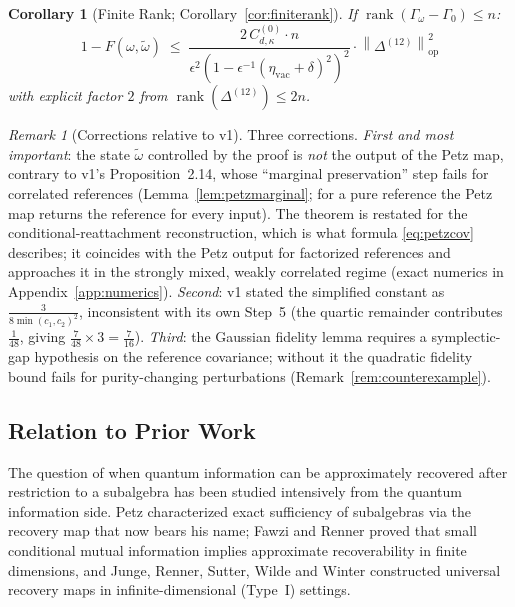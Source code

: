 \documentclass[11pt,a4paper]{article}
\theoremstyle{plain}
\newtheorem*{corollary*}{Corollary}
\theoremstyle{definition}
\theoremstyle{remark}
\newtheorem*{remark*}{Remark}
\newcommand{\opnorm}[1]{\left\lVert #1 \right\rVert_{\mathrm{op}}}
\newcommand{\rank}{\operatorname{rank}}
\newcommand{\etavac}{\eta_{\mathrm{vac}}}
\newcommand{\Cd}{C^{(0)}_{d,\kappa}}
\begin{document}
\begin{corollary*}[Finite Rank; Corollary~\ref{cor:finiterank}]
If $\rank(\Gamma_\omega - \Gamma_0) \le n$:
\begin{equation}
1 - F(\omega, \tilde{\omega}) \;\le\;
\frac{2\,\Cd \cdot n}{\epsilon^2 \left(1 - \epsilon^{-1}(\etavac + \delta)^2\right)^2}
\cdot \opnorm{\Delta^{(12)}}^2
\end{equation}
with explicit factor $2$ from $\rank(\Delta^{(12)}) \le 2n$.
\end{corollary*}

\begin{remark*}[Corrections relative to v1]
Three corrections. \emph{First and most important}: the state $\tilde{\omega}$
controlled by the proof is \emph{not} the output of the Petz map, contrary to
v1's Proposition~2.14, whose ``marginal preservation'' step fails for correlated
references (Lemma~\ref{lem:petzmarginal}; for a pure reference the Petz map
returns the reference for every input). The theorem is restated for the
conditional-reattachment reconstruction, which is what formula \eqref{eq:petzcov}
describes; it coincides with the Petz output for factorized references and
approaches it in the strongly mixed, weakly correlated regime (exact numerics in
Appendix~\ref{app:numerics}). \emph{Second}: v1 stated the simplified constant as
$\tfrac{3}{8\min(c_1,c_2)^2}$, inconsistent with its own Step~5 (the quartic
remainder contributes $\tfrac{1}{48}$, giving $\tfrac{7}{48}\times 3 =
\tfrac{7}{16}$). \emph{Third}: the Gaussian fidelity lemma requires a
symplectic-gap hypothesis on the reference covariance; without it the quadratic
fidelity bound fails for purity-changing perturbations
(Remark~\ref{rem:counterexample}).
\end{remark*}

\subsection{Relation to Prior Work}\label{sec:related}

The question of when quantum information can be approximately recovered after
restriction to a subalgebra has been studied intensively from the quantum
information side. Petz \cite{Petz86} characterized exact sufficiency of subalgebras
via the recovery map that now bears his name; Fawzi and Renner \cite{FawziRenner15}
proved that small conditional mutual information implies approximate recoverability
in finite dimensions, and Junge, Renner, Sutter, Wilde and Winter \cite{JRSWW18}
constructed universal recovery maps in infinite-dimensional (Type~I) settings.
\end{document}
